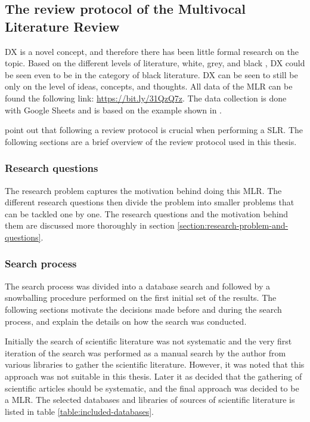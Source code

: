 \documentclass[english, 12pt, a4paper, sci, utf8, a-1b, online]{aaltothesis}
\newcounter{subsubsubsection}[subsubsection]
\begin{document}
\subsection{The review protocol of the Multivocal Literature Review}

\newcommand{\mlrdxlink}{https://bit.ly/31QzQ7z}

DX is a novel concept, and therefore there has been little formal research on the topic. Based on the different levels of literature, white, grey, and black \parencite{guidelines-for-MLR}, DX could be seen even to be in the category of black literature. DX can be seen to still be only on the level of ideas, concepts, and thoughts. All data of the MLR can be found the following link: \href{\mlrdxlink}{https://bit.ly/31QzQ7z}. The data collection is done with Google Sheets and is based on the example shown in \textcite{guidelines-for-MLR}.

\textcite{guidelines-for-SLR-in-SE} point out that following a review protocol is crucial when performing a SLR. The following sections are a brief overview of the review protocol used in this thesis.

\subsubsection{Research questions}

The research problem captures the motivation behind doing this MLR. The different research questions then divide the problem into smaller problems that can be tackled one by one. The research questions and the motivation behind them are discussed more thoroughly in section \ref{section:research-problem-and-questions}.

\subsubsection{Search process}

The search process was divided into a database search and followed by a snowballing procedure performed on the first initial set of the results. The following sections motivate the decisions made before and during the search process, and explain the details on how the search was conducted.


Initially the search of scientific literature was not systematic and the very first iteration of the search was performed as a manual search by the author from various libraries to gather the scientific literature. However, it was noted that this approach was not suitable in this thesis. Later it as decided that the gathering of scientific articles should be systematic, and the final approach was decided to be a MLR. The selected databases and libraries of sources of scientific literature is listed in table \ref{table:included-databases}.
\end{document}
